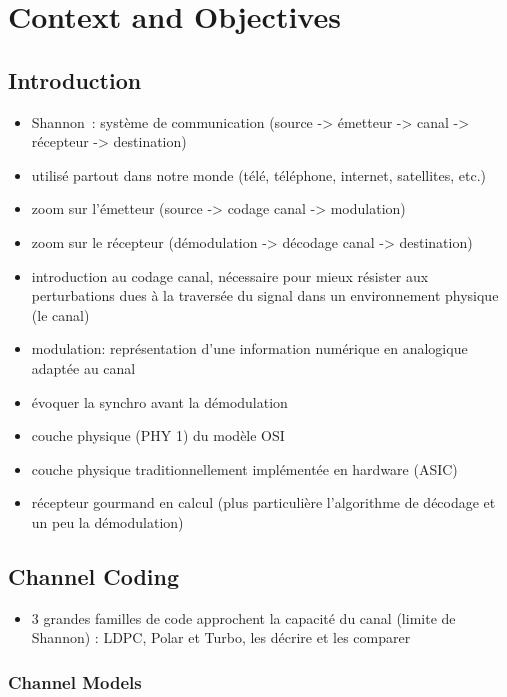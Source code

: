 \chapter{Context and Objectives}

\section{Introduction}

\begin{itemize}
  \item Shannon~\cite{Shannon1948}: système de communication (source -> émetteur
        -> canal -> récepteur -> destination)
  \item utilisé partout dans notre monde (télé, téléphone, internet, satellites,
        etc.)
  \item zoom sur l'émetteur (source -> codage canal -> modulation)
  \item zoom sur le récepteur (démodulation -> décodage canal -> destination)
  \item introduction au codage canal, nécessaire pour mieux résister aux
        perturbations dues à la traversée du signal dans un environnement
        physique (le canal)
  \item modulation: représentation d'une information numérique en analogique
        adaptée au canal
  \item évoquer la synchro avant la démodulation
  \item couche physique (PHY 1) du modèle OSI
  \item couche physique traditionnellement implémentée en hardware (ASIC)
  \item récepteur gourmand en calcul (plus particulière l'algorithme de décodage
        et un peu la démodulation)
\end{itemize}

\section{Channel Coding}

\begin{itemize}
  \item 3 grandes familles de code approchent la capacité du canal (limite de
        Shannon) : LDPC, Polar et Turbo, les décrire et les comparer
\end{itemize}

\subsection{Channel Models}

